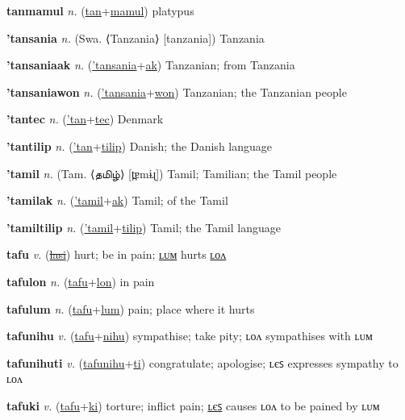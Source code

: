 \textbf{\hypertarget{tanmamul}{tanmamul}} \textit{n.} (\hyperlink{tan}{tan}+\allowbreak \hyperlink{mamul}{mamul})
platypus

\textbf{\hypertarget{'tansania}{'tansania}} \textit{n.} (Swa. ⟨Tanzania⟩ [tanzania])
Tanzania

\textbf{\hypertarget{'tansaniaak}{'tansaniaak}} \textit{n.} (\hyperlink{'tansania}{'tansania}+\allowbreak \hyperlink{ak}{ak})
Tanzanian; from Tanzania

\textbf{\hypertarget{'tansaniawon}{'tansaniawon}} \textit{n.} (\hyperlink{'tansania}{'tansania}+\allowbreak \hyperlink{won}{won})
Tanzanian; the Tanzanian people

\textbf{\hypertarget{'tantec}{'tantec}} \textit{n.} (\hyperlink{'tan}{'tan}+\allowbreak \hyperlink{tec}{tec})
Denmark

\textbf{\hypertarget{'tantilip}{'tantilip}} \textit{n.} (\hyperlink{'tan}{'tan}+\allowbreak \hyperlink{tilip}{tilip})
Danish; the Danish language

\textbf{\hypertarget{'tamil}{'tamil}} \textit{n.} (Tam. ⟨{\tamil{}தமிழ்}⟩ [t̪ɐmɨɻ])
Tamil; Tamilian; the Tamil people

\textbf{\hypertarget{'tamilak}{'tamilak}} \textit{n.} (\hyperlink{'tamil}{'tamil}+\allowbreak \hyperlink{ak}{ak})
Tamil; of the Tamil

\textbf{\hypertarget{'tamiltilip}{'tamiltilip}} \textit{n.} (\hyperlink{'tamil}{'tamil}+\allowbreak \hyperlink{tilip}{tilip})
Tamil; the Tamil language

\textbf{\hypertarget{tafu}{tafu}} \textit{v.} (\hyperlink{lasi}{\sout{lasi}})
hurt; be in pain; \hyperlink{tafulum}{ʟᴜᴍ} hurts \hyperlink{tafulon}{ʟᴏᴧ}

\textbf{\hypertarget{tafulon}{tafulon}} \textit{n.} (\hyperlink{tafu}{tafu}+\allowbreak \hyperlink{lon}{lon})
in pain

\textbf{\hypertarget{tafulum}{tafulum}} \textit{n.} (\hyperlink{tafu}{tafu}+\allowbreak \hyperlink{lum}{lum})
pain; place where it hurts

\textbf{\hypertarget{tafunihu}{tafunihu}} \textit{v.} (\hyperlink{tafu}{tafu}+\allowbreak \hyperlink{nihu}{nihu})
sympathise; take pity; ʟᴏᴧ sympathises with ʟᴜᴍ

\textbf{\hypertarget{tafunihuti}{tafunihuti}} \textit{v.} (\hyperlink{tafunihu}{tafunihu}+\allowbreak \hyperlink{ti}{ti})
congratulate; apologise; ʟєꜱ expresses sympathy to ʟᴏᴧ

\textbf{\hypertarget{tafuki}{tafuki}} \textit{v.} (\hyperlink{tafu}{tafu}+\allowbreak \hyperlink{ki}{ki})
torture; inflict pain; \hyperlink{tafukiles}{ʟєꜱ} causes ʟᴏᴧ to be pained by ʟᴜᴍ

